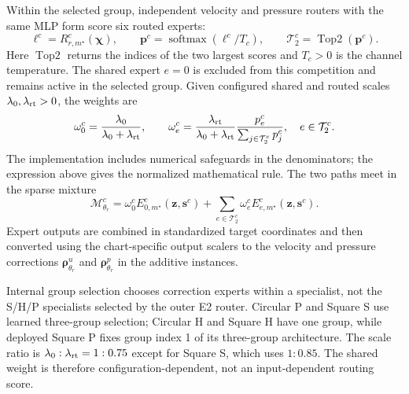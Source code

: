 Within the selected group, independent velocity and pressure routers
with the same MLP form score six routed experts:
\begin{equation}
  \bm\ell^c=R_{r,m^\star}^c(\bm\chi),
  \qquad
  \bm p^c=\operatorname{softmax}(\bm\ell^c/T_c),
  \qquad
  \mathcal T_2^c=\operatorname{Top2}(\bm p^c).
  \label{eq:main_channel_selection}
\end{equation}
Here $\operatorname{Top2}$ returns the indices of the two largest
scores and $T_c>0$ is the channel temperature. The shared expert
$e=0$ is excluded from this competition and remains active in the
selected group. Given configured shared and routed scales
$\lambda_0,\lambda_{\rm rt}>0$, the weights are
\begin{equation}
  \omega_0^c=\frac{\lambda_0}{\lambda_0+\lambda_{\rm rt}},
  \qquad
  \omega_e^c=
  \frac{\lambda_{\rm rt}}{\lambda_0+\lambda_{\rm rt}}
  \frac{p_e^c}{\sum_{j\in\mathcal T_2^c}p_j^c},
  \quad e\in\mathcal T_2^c.
  \label{eq:main_routing_weights}
\end{equation}
The implementation includes numerical safeguards in the denominators;
the expression above gives the normalized mathematical rule.
The two paths meet in the sparse mixture
\begin{equation}
  \mathcal M_{\theta_r}^c
  =\omega_0^c E_{0,m^\star}^c(\bm z,\bm s^c)
   +\sum_{e\in\mathcal T_2^c}
     \omega_e^c E_{e,m^\star}^c(\bm z,\bm s^c).
  \label{eq:main_inner_moe}
  \label{eq:app_channel_sparse_moe}
\end{equation}
Expert outputs are combined in standardized target coordinates and
then converted using the chart-specific output scalers to the
velocity and pressure corrections $\bm\rho^u_{\theta_r}$ and
$\bm\rho^p_{\theta_r}$ in the additive instances.

Internal group selection chooses correction experts within a
specialist, not the S/H/P specialists selected by the outer E2
router. Circular P and Square S use learned three-group selection;
Circular H and Square H have one group, while deployed Square P
fixes group index 1 of its three-group architecture. The scale ratio
is $\lambda_0:\lambda_{\rm rt}=1:0.75$ except for Square S, which
uses $1:0.85$. The shared weight is therefore configuration-dependent,
not an input-dependent routing score.

